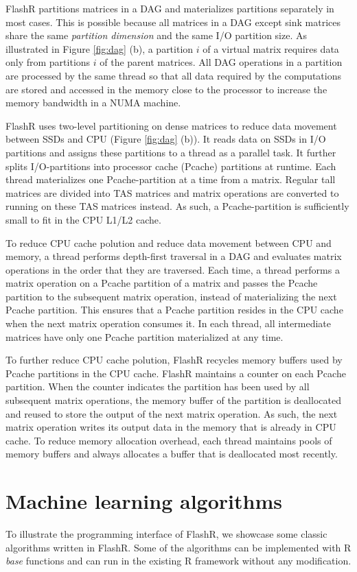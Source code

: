 FlashR partitions matrices in a DAG and materializes partitions separately in
most cases. This is possible because all matrices in a DAG except sink matrices
share the same \textit{partition dimension} and the same I/O partition size.
As illustrated in Figure \ref{fig:dag} (b), a partition $i$ of a virtual
matrix requires data only from partitions
$i$ of the parent matrices.  All DAG operations in a partition are processed by 
the same thread so that all data required by the computations are stored and
accessed in the memory close to the processor to increase the memory bandwidth
in a NUMA machine.

FlashR uses two-level partitioning on dense matrices to reduce data movement
between SSDs and CPU (Figure \ref{fig:dag} (b)). It reads data on SSDs in
I/O partitions and assigns these partitions to a thread as a parallel task.
It further splits I/O-partitions into processor cache (Pcache) partitions
at runtime.  Each thread materializes one Pcache-partition at a time from
a matrix. Regular tall matrices are divided into TAS matrices and matrix
operations are converted to running on these TAS matrices instead. As such,
a Pcache-partition is sufficiently small to fit in the CPU L1/L2 cache.

To reduce CPU cache polution and reduce data movement between CPU and memory,
a thread performs depth-first traversal in a DAG and evaluates matrix operations
in the order that they are traversed. Each time, a thread performs a matrix
operation on a Pcache partition of a matrix and passes the Pcache partition to
the subsequent matrix operation, instead of materializing the next Pcache partition.
This ensures that a Pcache partition resides in the CPU cache when the next
matrix operation consumes it. In each thread, all intermediate matrices have
only one Pcache partition materialized at any time.

To further reduce CPU cache polution, FlashR recycles memory buffers used
by Pcache partitions in the CPU cache. FlashR maintains a counter on each
Pcache partition.
When the counter indicates the partition has been used by all subsequent
matrix operations, the memory buffer of the partition is deallocated and
reused to store the output of
the next matrix operation. As such, the next matrix operation writes
its output data in the memory that is already in CPU cache. To reduce
memory allocation overhead, each thread maintains pools of memory buffers
and always allocates a buffer that is deallocated most recently.

\section{Machine learning algorithms} \label{sec:apps}
To illustrate the programming interface of FlashR, we showcase some classic
algorithms written in FlashR.
Some of the algorithms can be implemented with R \textit{base} functions and
can run in the existing R framework without any modification.

